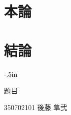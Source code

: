 \documentclass[a4paper,12pt]{jreport}
\begin{document}
\chapter{本論}

\chapter{結論}

\clearpage

\thispagestyle{empty}
\oddsidemargin -4in
\evensidemargin -4in
\topmargin -.5in
{
\tate
\Large\sffamily\gtfamily
\begin{minipage}{9.5in}
\begin{minipage}{6.0in}
題目
\end{minipage}
\hfill\hfill\hfill\hfill
350702101
\hfill
後藤 隼弐
\end{minipage}
}
\end{document}
